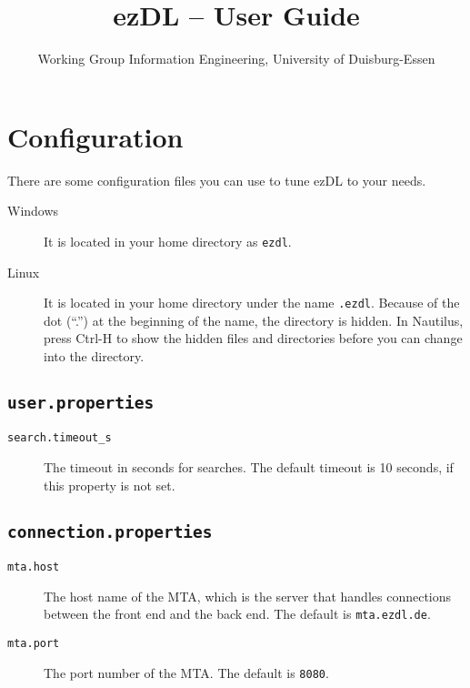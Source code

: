 \documentclass[12pt]{book}
\title{ezDL -- User Guide}
\author{Working Group Information Engineering, University of Duisburg-Essen}
\date{}
\begin{document}
  \maketitle 
  
\tableofcontents  

  
\newcommand{\itemtt}[1]{\item[\texttt{#1}]}
  
  
\chapter{Configuration}

There are some configuration files you can use to tune ezDL to your needs. 

\begin{description}
\item[Windows] It is located in your home directory as \texttt{ezdl}.
\item[Linux] It is located in your home directory under the name \texttt{.ezdl}. Because of the dot (``.'') at the beginning of the name, the directory is hidden. In Nautilus, press Ctrl-H to show the hidden files and directories before you can change into the directory.
\end{description}



\section{\texttt{user.properties}}

\begin{description}
\itemtt{search.timeout\_s} The timeout in seconds for searches. The default timeout is 10 seconds, if this property is not set.
\end{description}



\section{\texttt{connection.properties}}

\begin{description}
\itemtt{mta.host} The host name of the MTA, which is the server that handles connections between the front end and the back end. The default is \texttt{mta.ezdl.de}.
\itemtt{mta.port} The port number of the MTA. The default is \texttt{8080}.
\end{description}
\end{document}
